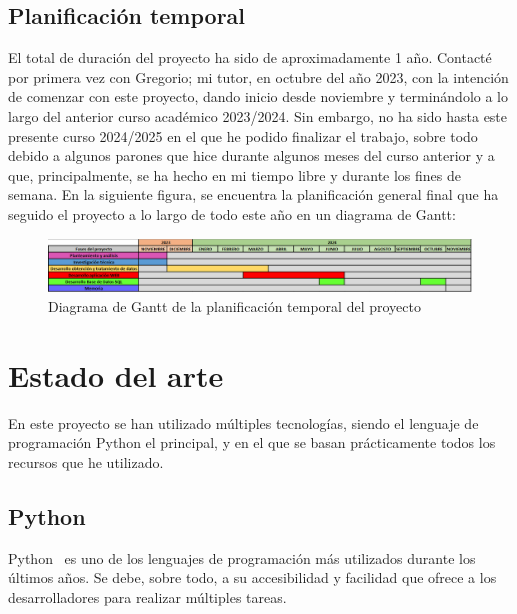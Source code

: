 \documentclass[a4paper, 12pt]{book}
\begin{document}
\section{Planificación temporal}
\label{sec:planificacion-temporal}

El total de duración del proyecto ha sido de aproximadamente 1 año. Contacté por primera vez con Gregorio; mi tutor, en octubre del año 2023, con la intención de comenzar con este proyecto, dando inicio desde noviembre y terminándolo a lo largo del anterior curso académico 2023/2024. Sin embargo, no ha sido hasta este presente curso 2024/2025 en el que he podido finalizar el trabajo, sobre todo debido a algunos parones que hice durante algunos meses del curso anterior y a que, principalmente, se ha hecho en mi tiempo libre y durante los fines de semana. En la siguiente figura, se encuentra la planificación general final que ha seguido el proyecto a lo largo de todo este año en un diagrama de Gantt:

\begin{figure}[H]
  \centering
  \includegraphics[width=1\textwidth]{img/diagramagantt.png}
  \caption{Diagrama de Gantt de la planificación temporal del proyecto}
    \label{figura:diagrama}
\end{figure}


\cleardoublepage
\chapter{Estado del arte}
\label{chap:estado}

En este proyecto se han utilizado múltiples tecnologías, siendo el lenguaje de programación Python el principal, y en el que se basan prácticamente todos los recursos que he utilizado.

\section{Python}
\label{sec:Python}

Python~\cite{python:_python} es uno de los lenguajes de programación más utilizados durante los últimos años. Se debe, sobre todo, a su accesibilidad y facilidad que ofrece a los desarrolladores para realizar múltiples tareas.
\end{document}
